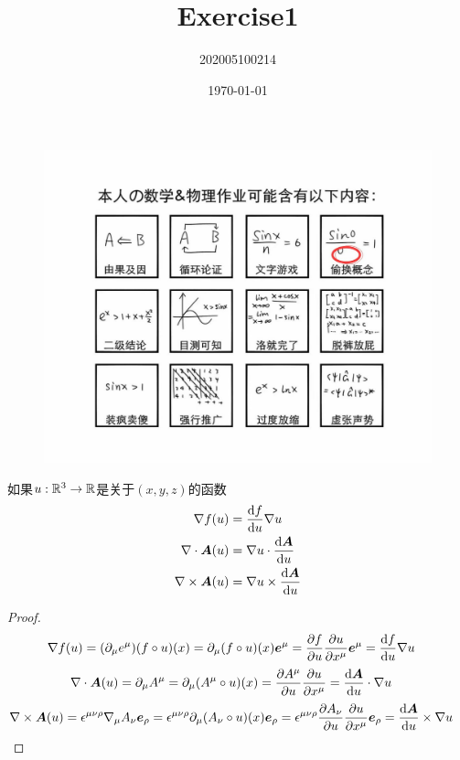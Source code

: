 \documentclass{mynote}
\title{Exercise1}
\author{202005100214}
\date\today
\begin{document}
\maketitle
\begin{figure}[H]
    \centering
    \includegraphics[width=6in]{Imgs/QQ_Image_1664445649724.jpg}
\end{figure}
\newpage




\begin{exercise}{1.2}
    如果$u:\mathbb{R}^3 \to \mathbb{R}$是关于$(x,y,z)$的函数
    \begin{gather*}
        \nabla f(u) = \frac{\mathop{}\!\mathrm{d} f}{\mathop{}\!\mathrm{d} u} \nabla u \\
        \nabla \cdot \boldsymbol{A}(u) = \nabla u \cdot \frac{\mathop{}\!\mathrm{d} \boldsymbol{A}}{\mathop{}\!\mathrm{d} u} \\
        \nabla \times \boldsymbol{A} (u) = \nabla u \times \frac{\mathop{}\!\mathrm{d} \boldsymbol{A}}{\mathop{}\!\mathrm{d} u}
    \end{gather*}
\end{exercise}
\begin{proof}
    \begin{align*}
        \nabla f(u) &= (\partial_{\mu} e^{\mu }) (f \circ u)(x) = \partial_{\mu} (f \circ u)(x) \boldsymbol{e}^{\mu} = \dfrac{\partial f}{\partial u} \dfrac{\partial u}{\partial x^{\mu}}\boldsymbol{e}^{\mu} = \frac{\mathop{}\!\mathrm{d} f}{\mathop{}\!\mathrm{d} u} \nabla u
    \end{align*}
    \begin{align*}
        \nabla \cdot \boldsymbol{A}(u) &= \partial_{\mu} A^{\mu} = \partial_{\mu} (A^{\mu} \circ u) (x) = \dfrac{\partial A^{\mu}}{\partial u} \dfrac{\partial u}{\partial x^{\mu}} = \frac{\mathop{}\!\mathrm{d} \boldsymbol{A}}{\mathop{}\!\mathrm{d} u} \cdot \nabla u
    \end{align*}
    \begin{align*}
        \nabla \times \boldsymbol{A} (u) &= \epsilon^{\mu \nu \rho} \nabla_{\mu} A_{\nu} \boldsymbol{e}_{\rho} = \epsilon^{\mu \nu \rho}  \partial_{\mu} (A_{\nu} \circ u)(x) \boldsymbol{e}_{\rho} = \epsilon^{\mu \nu \rho}  \dfrac{\partial A_{\nu}}{\partial u} \dfrac{\partial u}{\partial x^{\mu}} \boldsymbol{e}_{\rho} =\frac{\mathop{}\!\mathrm{d} \boldsymbol{A}}{\mathop{}\!\mathrm{d} u} \times \nabla u
    \end{align*}
\end{proof}
\end{document}
